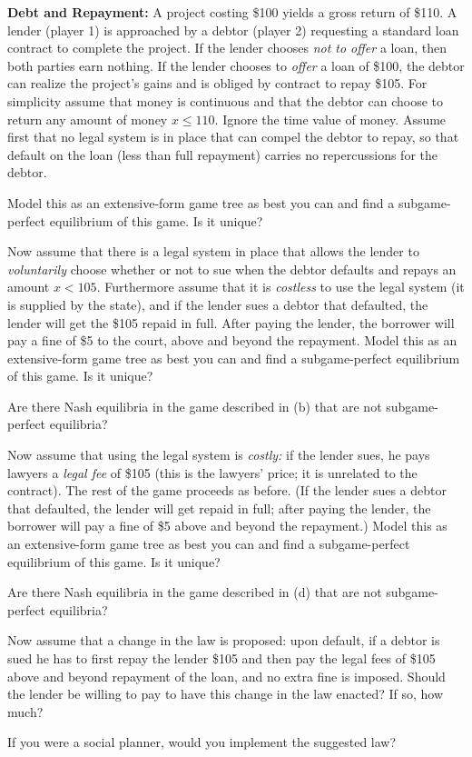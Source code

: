 \textbf{Debt and Repayment:} A project costing \$100 yields a gross return of \$110. A
lender (player 1) is approached by a debtor (player 2) requesting a standard loan contract to
complete the project. If the lender chooses \emph{not to offer} a loan, then both parties earn
nothing. If the lender chooses to \emph{offer} a loan of \$100, the debtor can realize the project's
gains and is obliged by contract to repay \$105. For simplicity assume that money is continuous and
that the debtor can choose to return any amount of money $x \le 110$. Ignore the time value of
money. Assume first that no legal system is in place that can compel the debtor to repay, so that
default on the loan (less than full repayment) carries no repercussions for the debtor.
\begin{partes}
\item Model this as an extensive-form game tree as best you can and find a subgame-perfect
equilibrium of this game. Is it unique?
\item Now assume that there is a legal system in place that allows the lender to
\emph{voluntarily} choose whether or not to sue when the debtor defaults and repays an amount
$x < 105$. Furthermore assume that it is \emph{costless} to use the legal system (it is supplied by
the state), and if the lender sues a debtor that defaulted, the lender will get the \$105 repaid in
full. After paying the lender, the borrower will pay a fine of \$5 to the court, above and beyond
the repayment. Model this as an extensive-form game tree as best you can and find a subgame-perfect
equilibrium of this game. Is it unique?
\item Are there Nash equilibria in the game described in (b) that are not subgame-perfect
equilibria?
\item Now assume that using the legal system is \emph{costly:} if the lender sues, he pays lawyers a
\emph{legal fee} of \$105 (this is the lawyers' price; it is unrelated to the contract). The rest of
the game proceeds as before. (If the lender sues a debtor that defaulted, the lender will get repaid
in full; after paying the lender, the borrower will pay a fine of \$5 above and beyond the
repayment.) Model this as an extensive-form game tree as best you can and find a subgame-perfect
equilibrium of this game. Is it unique?
\item Are there Nash equilibria in the game described in (d) that are not subgame-perfect
equilibria?
\item Now assume that a change in the law is proposed: upon default, if a debtor is sued he has to
first repay the lender \$105 and then pay the legal fees of \$105 above and beyond repayment of the
loan, and no extra fine is imposed. Should the lender be willing to pay to have this change in the
law enacted? If so, how much?
\item If you were a social planner, would you implement the suggested law?
\end{partes}
\resolespaco

